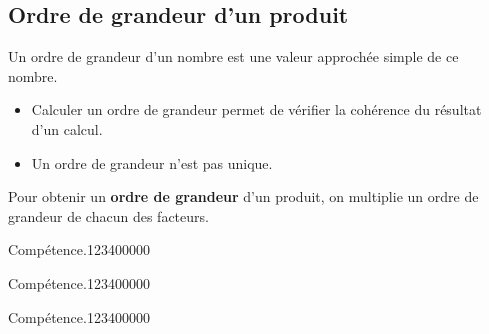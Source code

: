 \begin{pageCours}
\section{Ordre de grandeur d'un produit}

\begin{Def}
Un ordre de grandeur d'un nombre est une valeur approchée simple de ce nombre.
\end{Def}

\begin{Rq}
\begin{itemize}
\item  Calculer un ordre de grandeur permet de vérifier la cohérence du résultat d'un calcul.
\item Un ordre de grandeur n'est pas unique.
\end{itemize}
\end{Rq}

\begin{Reg}
Pour obtenir un \textbf{ordre de grandeur} d'un produit, on multiplie un ordre de grandeur de chacun des facteurs.
\end{Reg} 

\end{pageCours} %


\begin{pageAD}  %
\restoregeometry %


\begin{ExoCad}{Compétence.}{1234}{0}{0}{0}{0}{0}

\end{ExoCad}


\begin{ExoCad}{Compétence.}{1234}{0}{0}{0}{0}{0}

\end{ExoCad}


\begin{ExoCad}{Compétence.}{1234}{0}{0}{0}{0}{0}

\end{ExoCad}
 
\end{pageAD} %

